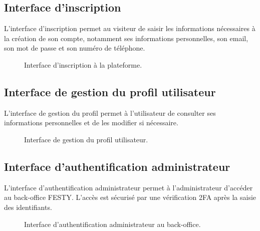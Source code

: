 \subsection{Interface d’inscription}


L’interface d’inscription permet au visiteur de saisir les informations nécessaires à la création de son compte, notamment ses informations personnelles, son email, son mot de passe et son numéro de téléphone.


\begin{figure}[H]
\centering
{}
\caption{Interface d’inscription à la plateforme.}
\label{figure:3-7}
\end{figure}


\subsection{Interface de gestion du profil utilisateur}


L’interface de gestion du profil permet à l’utilisateur de consulter ses informations personnelles et de les modifier si nécessaire.


\begin{figure}[H]
\centering
{}
\caption{Interface de gestion du profil utilisateur.}
\label{figure:3-8}
\end{figure}


\subsection{Interface d’authentification administrateur}


L’interface d’authentification administrateur permet à l’administrateur d’accéder au back-office FESTY. L’accès est sécurisé par une vérification 2FA après la saisie des identifiants.


\begin{figure}[H]
\centering
{}
\caption{Interface d’authentification administrateur au back-office.}
\label{figure:3-9}
\end{figure}


